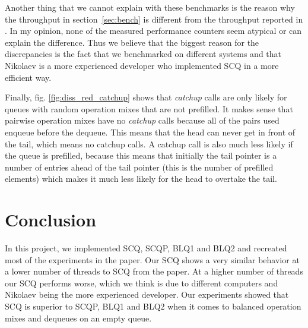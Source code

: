\documentclass{article}      %
\begin{document}
Another thing that we cannot explain with these benchmarks is the reason why the throughput in section~\ref{sec:bench} is different from the throughput reported in \cite{nikolaev2019scalable}. In my opinion, none of the measured performance counters seem atypical or can explain the difference. Thus we believe that the biggest reason for the discrepancies is the fact that we benchmarked on different systems and that Nikolaev is a more experienced developer who implemented SCQ in a more efficient way.

Finally, fig. \ref{fig:diss_red_catchup} shows that \textit{catchup} calls are only likely for queues with random operation mixes that are not prefilled. It makes sense that pairwise operation mixes have no \textit{catchup} calls because all of the pairs used enqueue before the dequeue. This means that the head can never get in front of the tail, which means no catchup calls. A catchup call is also much less likely if the queue is prefilled, because this means that initially the tail pointer is a number of entries ahead of the tail pointer (this is the number of prefilled elements) which makes it much less likely for the head to overtake the tail.



\section{Conclusion}
In this project, we implemented SCQ, SCQP, BLQ1 and BLQ2 and recreated most of the experiments in the paper. Our SCQ shows a very similar behavior at a lower number of threads to SCQ from the paper. At a higher number of threads our SCQ performs worse, which we think is due to different computers and Nikolaev being the more experienced developer. Our experiments showed that SCQ is superior to SCQP, BLQ1 and BLQ2 when it comes to balanced operation mixes and dequeues on an empty queue.
\end{document}

